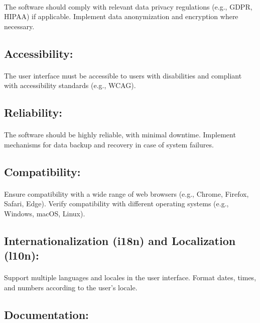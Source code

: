 \documentclass{article}
\begin{document}
\paragraph{}
The software should comply with relevant data privacy regulations (e.g., GDPR, HIPAA) if applicable.
Implement data anonymization and encryption where necessary.

\subsection{Accessibility:}
\paragraph{}
The user interface must be accessible to users with disabilities and compliant with accessibility standards (e.g., WCAG).

\subsection{Reliability:}
\paragraph{}
The software should be highly reliable, with minimal downtime.
Implement mechanisms for data backup and recovery in case of system failures.

\subsection{Compatibility:}
\paragraph{}
Ensure compatibility with a wide range of web browsers (e.g., Chrome, Firefox, Safari, Edge).
Verify compatibility with different operating systems (e.g., Windows, macOS, Linux).

\subsection{Internationalization (i18n) and Localization (l10n):}
\paragraph{}
Support multiple languages and locales in the user interface.
Format dates, times, and numbers according to the user's locale.

\subsection{Documentation:}
\end{document}
